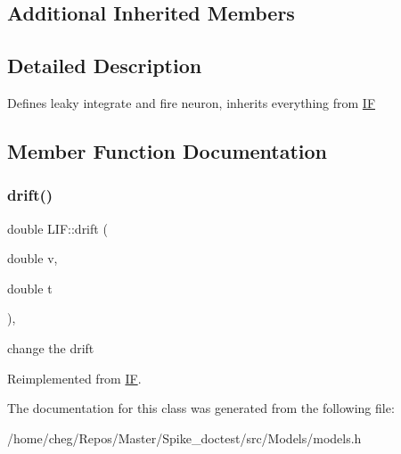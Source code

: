 \subsection*{Additional Inherited Members}


\subsection{Detailed Description}
Defines leaky integrate and fire neuron, inherits everything from \hyperlink{classIF}{IF} 

\subsection{Member Function Documentation}
\mbox{\label{classLIF_aea677a0cf3f943edb7a957479e18d6dc}} 
\subsubsection{\texorpdfstring{drift()}{drift()}}
{\footnotesize\ttfamily double L\+I\+F\+::drift (\begin{DoxyParamCaption}\item[{double}]{v,  }\item[{double}]{t }\end{DoxyParamCaption})\hspace{0.3cm}{\ttfamily [inline]}, {\ttfamily [virtual]}}

change the drift 

Reimplemented from \hyperlink{classIF}{IF}.



The documentation for this class was generated from the following file\+:\begin{DoxyCompactItemize}
\item 
/home/cheg/\+Repos/\+Master/\+Spike\+\_\+doctest/src/\+Models/models.\+h\end{DoxyCompactItemize}
